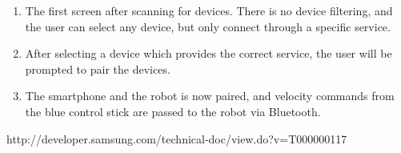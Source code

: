 \begin{enumerate}
	\item The first screen after scanning for devices. There is no device filtering, and the user can select any device, but only connect through a specific service.
	\item After selecting a device which provides the correct service, the user will be prompted to pair the devices.
	\item The smartphone and the robot is now paired, and velocity commands from the blue control stick are passed to the robot via Bluetooth.
\end{enumerate}

http://developer.samsung.com/technical-doc/view.do?v=T000000117
